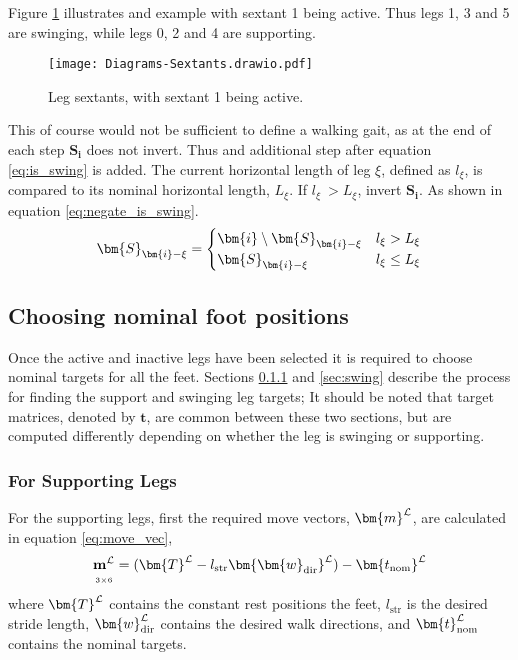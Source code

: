     Figure \ref{fig:sextants} illustrates and example with sextant 1 being active. Thus legs 1, 3 and 5 are swinging, while legs 0, 2 and 4 are supporting.
    \begin{figure}[h]
        \centering
        \hspace{1.1cm}
        \texttt{[image: Diagrams-Sextants.drawio.pdf]}
        \caption{Leg sextants, with sextant 1 being active.} 
        \label{fig:sextants}
    \end{figure}
    
    \noindent
    This of course would not be sufficient to define a walking gait, as at the end of each step \(\bm{S_i}\) does not invert.
    Thus and additional step after equation \ref{eq:is_swing} is added. The current horizontal length of leg \(\xi\), defined as \(l_\xi\), is compared to its nominal
    horizontal length, \(L_\xi\). If \(l_\xi\ > L_\xi\), invert \(\bm{S_i}\). As shown in equation \ref{eq:negate_is_swing}.
    \begin{equation} \label{eq:negate_is_swing}
        \bm{S}_{\bm{i} - \xi} =
                                            \begin{cases}
                                                \bm{i} \setminus \bm{S}_{\bm{i} - \xi} & l_\xi > L_\xi \\
                                                \bm{S}_{\bm{i} - \xi} & l_\xi \leq L_\xi
                                            \end{cases}\\[0.1cm]
    \end{equation}

    \newpage
    \subsection{Choosing nominal foot positions}    
    Once the active and inactive legs have been selected it is required to choose nominal targets for all the feet. Sections \ref{sec:support} and \ref{sec:swing}
    describe the process for finding the support and swinging leg targets; It should be noted that target matrices, denoted by \(\bm{t}\), are common between these two sections, but are computed
    differently depending on whether the leg is swinging or supporting.
        
    \subsubsection{For Supporting Legs} \label{sec:support}
    For the supporting legs, first the required move vectors, \(\bm{m} \inrefframe{L}\), are calculated in equation \ref{eq:move_vec},
    \begin{equation} 
        \mdim{\bf{m}\inrefframe{L}}{3}{6} = (\bm{T}\inrefframe{L} - l_\text{str} \bm{\bm{w}_\text{dir}}\inrefframe{L}) - \bm{t_\text{nom}}\inrefframe{L} \label{eq:move_vec}
    \end{equation}
    where \(\bm{T}\inrefframe{L}\) contains the constant rest positions the feet, \(l_\text{str}\) is the desired stride length, \(\bm{w}_\text{dir}\inrefframe{L}\)
    contains the desired walk directions, and \(\bm{t}_\text{nom} \inrefframe{L}\) contains the nominal targets.

